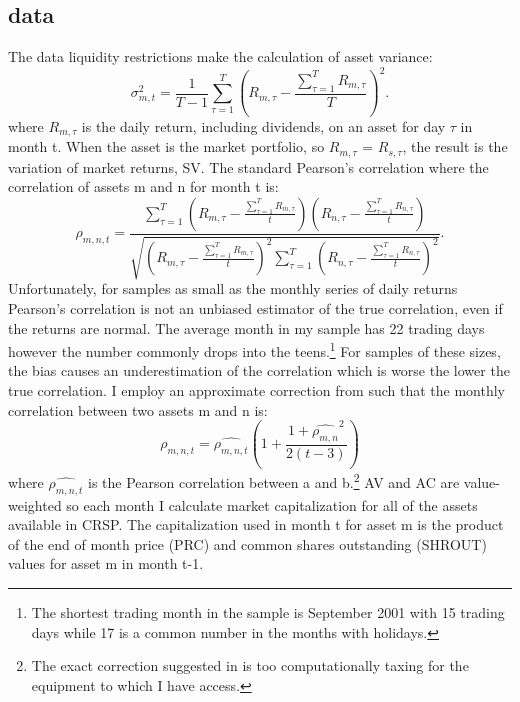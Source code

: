 \subsection{data}
The data liquidity restrictions make the calculation of asset variance:
\begin{equation}
	\sigma^{2}_{m,t} = \frac{1}{T-1}\sum_{\tau = 1}^{T} \left(R_{m,\tau} - \frac{\sum_{\tau = 1}^{T} R_{m,\tau}}{T}\right)^{2}.
\end{equation}
where $R_{m,\tau}$ is the daily return, including dividends, on an asset for day $\tau$ in month t. When the asset is the market portfolio, so $R_{m,\tau}$ = $R_{s,\tau}$, the result is the variation of market returns, SV. The standard Pearson’s correlation where the correlation of assets m and n for month t is:
\begin{equation}
	\rho_{m,n,t} = \frac{\sum^{T}_{\tau = 1}\left(R_{m,\tau} - \frac{\sum_{\tau = 1}^{T} R_{m,\tau}}{t}\right)\left(R_{n,\tau} - \frac{\sum_{\tau = 1}^{T} R_{n,\tau}}{t}\right)}{\sqrt{\left(R_{m,\tau} - \frac{\sum_{\tau = 1}^{T} R_{m,\tau}}{t}\right)^{2}\sum_{\tau=1}^{T}\left(R_{n,\tau} - \frac{\sum_{\tau = 1}^{T} R_{n,\tau}}{t}\right)^{2} }}.
\end{equation}
Unfortunately, for samples as small as the monthly series of daily returns Pearson’s correlation is not an unbiased estimator of the true correlation, even if the returns are normal. \citep{hotelling_1953} The average month in my sample has 22 trading days however the number commonly drops into the teens.\footnote{The shortest trading month in the sample is September 2001 with 15 trading days while 17 is a common number in the months with holidays.} For samples of these sizes, the bias causes an underestimation of the correlation which is worse the lower the true correlation. I employ an approximate correction from \cite{olkin_1958} such that the monthly correlation between two assets m and n is:
\begin{equation}
	\rho_{m,n,t} = \widehat{\rho_{m,n,t}}\left(1 + \frac{1+\widehat{\rho_{m,n}}^{2}}{2(t-3)}\right)
\end{equation}
where $\widehat{\rho_{m,n,t}}$ is the Pearson correlation between a and b.\footnote{The exact correction suggested in \cite{olkin_1958} is too computationally taxing for the equipment to which I have access.} AV and AC are value-weighted so each month I calculate market capitalization for all of the assets available in CRSP. The capitalization used in month t for asset m is the product of the end of month price (PRC) and common shares outstanding (SHROUT) values for asset m in month t-1. \\
